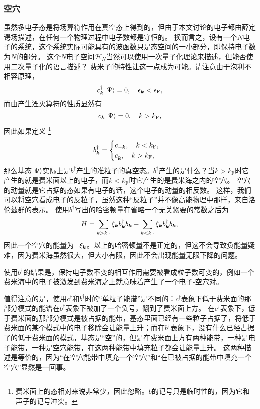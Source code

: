 \subsubsection{空穴} 

虽然多电子态是将场算符作用在真空态上得到的，但由于本文讨论的电子都由薛定谔场描述，在任何一个物理过程中电子数都是守恒的。
换而言之，设有一个$N$电子的系统，这个系统实际可能具有的波函数只是态空间的一小部分，即保持电子数为$N$的部分。
这个$N$电子空间$\mathcal{H}_N$当然可以使用一次量子化理论来描述，但能否使用二次量子化的语言描述？
费米子的特性让这一点成为可能。请注意由于泡利不相容原理，
\[
    {c}^\dagger_{\vb*{k}} \ket{\Psi} = 0, \quad \epsilon_{\vb*{k}} < \epsilon_\text{F},
\]
而由产生湮灭算符的性质显然有
\[
    {c}_{\vb*{k}} \ket{\Psi} = 0, \quad k > k_\text{F},
\]
因此如果定义%
\footnote{费米面上的态相对来说非常少，因此忽略。$b$的记号只是临时性的，因为它和声子的记号冲突。}%
\begin{equation}
    {b}^\dagger_{\vb*{k}} = \begin{cases}
        {c}_{-\vb*{k}}, \quad k < k_\text{F}, \\
        {c}_{\vb*{k}}^\dagger, \quad k > k_\text{F},
    \end{cases}
    \label{eq:occupied-electron-hole-flip}
\end{equation}
那么基态$\ket{\Psi}$实际上是${b}^\dagger$产生的准粒子的真空态。${b}^\dagger$产生的是什么？当$k>k_\text{F}$时它产生的就是费米面以上的电子，而$k<k_\text{F}$时它产生的是费米海之内的空穴。
空穴的动量就是它占据的态如果有电子的话，这个电子的动量的相反数。%
这样，我们可以将空穴看成电子的反粒子，虽然这种“反粒子”并不像高能物理中那样，来自洛伦兹群的表示。
使用${b}^\dagger$写出的哈密顿量在省略一个无关紧要的常数之后为
\begin{equation}
    {H} = \sum_{k > k_\text{F}} \xi_{\vb*{k}} {b}^\dagger_{\vb*{k}} {b}_{\vb*{k}} - \sum_{k < k_\text{F}} \xi_{\vb*{k}} {b}^\dagger_{\vb*{k}} {b}_{\vb*{k}},
    \label{eq:particle-and-hole-hamiltonian}
\end{equation}
因此一个空穴的能量为$-\xi_{\vb*{k}}$。以上的哈密顿量不是正定的，但这不会导致负能量疑难，因为费米海虽然很大，但大小有限，因此不会出现能量无限下降的问题。

使用${b}^\dagger$的结果是，保持电子数不变的相互作用需要被看成粒子数可变的，例如一个费米海中的电子被激发到费米海之上就意味着产生了一个电子-空穴对。

值得注意的是，使用$c^\dagger$和$b^\dagger$时的“单粒子能谱”是不同的：$c^\dagger$表象下低于费米面的那部分模式的能谱在$b^\dagger$表象下被加了一个负号，翻到了费米面上方。
在$c^\dagger$表象下，低于费米面的那部分模式是被占据的能带，基态里面已经有一些粒子占据了，将低于费米面的某个模式中的电子移除会让能量上升；而在$b^\dagger$表象下，没有什么已经占据了的低于费米面的模式，基态是“空”的，但是在费米面上方有两种能带，一种是电子能带，一种是空穴能带，在这两种能带中填充粒子都会让能量上升。
这两种描述是等价的，因为“在空穴能带中填充一个空穴”和“在已被占据的能带中填充一个空穴”显然是一回事。

